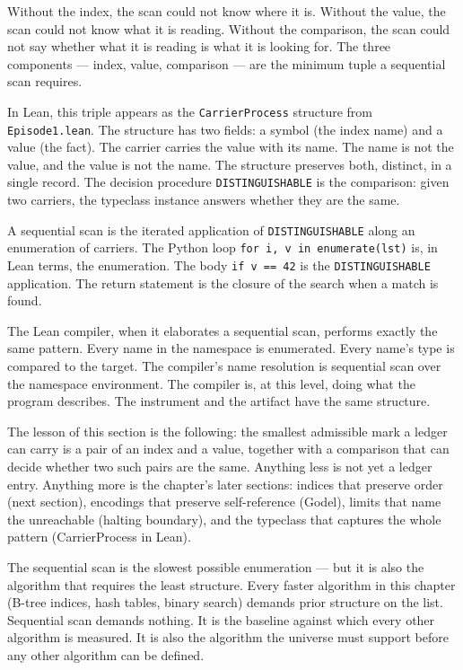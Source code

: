 Without the index, the scan could not know where it is. Without the value, the
scan could not know what it is reading. Without the comparison, the scan could
not say whether what it is reading is what it is looking for. The three
components --- index, value, comparison --- are the minimum tuple a sequential
scan requires.

In Lean, this triple appears as the \texttt{CarrierProcess} structure from
\texttt{Episode1.lean}. The structure has two fields: a symbol (the index name)
and a value (the fact). The carrier carries the value with its name. The name
is not the value, and the value is not the name. The structure preserves both,
distinct, in a single record. The decision procedure \texttt{DISTINGUISHABLE}
is the comparison: given two carriers, the typeclass instance answers whether
they are the same.

A sequential scan is the iterated application of \texttt{DISTINGUISHABLE} along
an enumeration of carriers. The Python loop \texttt{for i, v in enumerate(lst)}
is, in Lean terms, the enumeration. The body \texttt{if v == 42} is the
\texttt{DISTINGUISHABLE} application. The return statement is the closure of
the search when a match is found.

The Lean compiler, when it elaborates a sequential scan, performs exactly the
same pattern. Every name in the namespace is enumerated. Every name's type is
compared to the target. The compiler's name resolution is sequential scan over
the namespace environment. The compiler is, at this level, doing what the
program describes. The instrument and the artifact have the same structure.

The lesson of this section is the following: the smallest admissible mark a
ledger can carry is a pair of an index and a value, together with a comparison
that can decide whether two such pairs are the same. Anything less is not yet
a ledger entry. Anything more is the chapter's later sections: indices that
preserve order (next section), encodings that preserve self-reference (Godel),
limits that name the unreachable (halting boundary), and the typeclass that
captures the whole pattern (CarrierProcess in Lean).

The sequential scan is the slowest possible enumeration --- but it is also the
algorithm that requires the least structure. Every faster algorithm in this
chapter (B-tree indices, hash tables, binary search) demands prior structure on
the list. Sequential scan demands nothing. It is the baseline against which
every other algorithm is measured. It is also the algorithm the universe must
support before any other algorithm can be defined.

